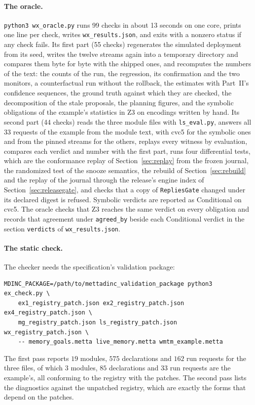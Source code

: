 \documentclass[11pt]{article}
\newcommand{\fpath}[1]{\nolinkurl{#1}}
\newcommand{\code}[1]{\texttt{#1}}
\theoremstyle{definition}
\theoremstyle{plain}
\begin{document}
\paragraph{The oracle.} \code{python3 wx\_oracle.py} runs 99 checks in
about 13 seconds on one core, prints one line per check,
writes \fpath{wx_results.json}, and exits with a nonzero status if any check fails. Its first part
(55 checks) regenerates the simulated deployment from its seed, writes the twelve
streams again into a temporary directory and compares them byte for byte with the shipped ones,
and recomputes the numbers of the text: the counts of the run, the regression, its confirmation and
the two monitors, a counterfactual run without the rollback, the estimates with Part~II's confidence
sequences, the ground truth against which they are checked, the decomposition of the stale
proposals, the planning figures, and the symbolic obligations of the example's statistics in Z3 on
encodings written by hand. Its second part (44 checks) reads the three module
files with \fpath{ls_eval.py}, answers all $33$ requests of the example from the module text, with
cvc5 for the symbolic ones and from the pinned streams for the others, replays every witness by
evaluation, compares each verdict and number with the first part, runs four differential
tests, which are the conformance replay of Section~\ref{sec:replay} from the frozen journal, the
randomized test of the snooze semantics, the rebuild of Section~\ref{sec:rebuild} and the replay of
the journal through the release's engine index of Section~\ref{sec:releasegate}, and checks that a
copy of \code{RepliesGate} changed under its declared digest is refused. Symbolic verdicts are
reported as Conditional on cvc5. The oracle checks that Z3 reaches the same verdict on every
obligation and records that agreement under \code{agreed\_by} beside each Conditional verdict in
the section \code{verdicts} of \fpath{wx_results.json}.

\paragraph{The static check.} The checker needs the specification's validation package:
\begin{lstlisting}
MDINC_PACKAGE=/path/to/mettadinc_validation_package python3 ex_check.py \
    ex1_registry_patch.json ex2_registry_patch.json ex4_registry_patch.json \
    mg_registry_patch.json ls_registry_patch.json wx_registry_patch.json \
    -- memory_goals.metta live_memory.metta wmtm_example.metta
\end{lstlisting}
The first pass reports $19$ modules, $575$ declarations and $162$ run requests for the three files,
of which $3$ modules, $85$ declarations and $33$ run requests are the example's, all conforming to
the registry with the patches. The second pass lists the diagnostics against the unpatched registry,
which are exactly the forms that depend on the patches.
\end{document}
